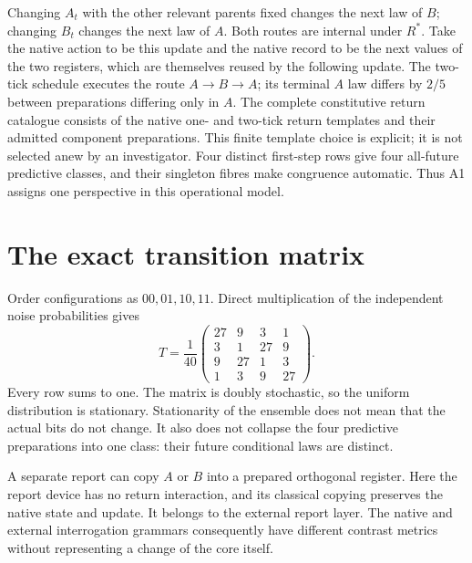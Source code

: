 Changing $A_t$ with the other relevant parents fixed changes the next law of $B$; changing $B_t$ changes the next law of $A$. Both routes are internal under $R^\ast$. Take the native action to be this update and the native record to be the next values of the two registers, which are themselves reused by the following update. The two-tick schedule executes the route $A\to B\to A$; its terminal $A$ law differs by $2/5$ between preparations differing only in $A$. The complete constitutive return catalogue consists of the native one- and two-tick return templates and their admitted component preparations. This finite template choice is explicit; it is not selected anew by an investigator. Four distinct first-step rows give four all-future predictive classes, and their singleton fibres make congruence automatic. Thus A1 assigns one perspective in this operational model.

\section{The exact transition matrix}\label{section:worked:the-exact-transition-matrix}
Order configurations as $00,01,10,11$. Direct multiplication of the independent noise probabilities gives
\begin{equation}\label{eq:twobitT}
T=\frac1{40}
\begin{pmatrix}
27&9&3&1\\
3&1&27&9\\
9&27&1&3\\
1&3&9&27
\end{pmatrix}.
\end{equation}
Every row sums to one. The matrix is doubly stochastic, so the uniform distribution is stationary. Stationarity of the ensemble does not mean that the actual bits do not change. It also does not collapse the four predictive preparations into one class: their future conditional laws are distinct.

A separate report can copy $A$ or $B$ into a prepared orthogonal register. Here the report device has no return interaction, and its classical copying preserves the native state and update. It belongs to the external report layer. The native and external interrogation grammars consequently have different contrast metrics without representing a change of the core itself.

